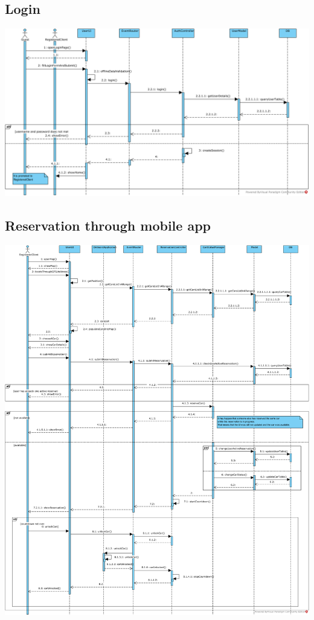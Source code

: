 \subsection{Login}
\begin{minipage}{\textwidth}
\includegraphics[width=\textwidth, keepaspectratio]{../images/architectural_design/rv_login.png}
\end{minipage}

\subsection{Reservation through mobile app}
\begin{minipage}{\textwidth}
\includegraphics[width=\textwidth, keepaspectratio]{../images/architectural_design/rv_reservation.png}
\end{minipage}

